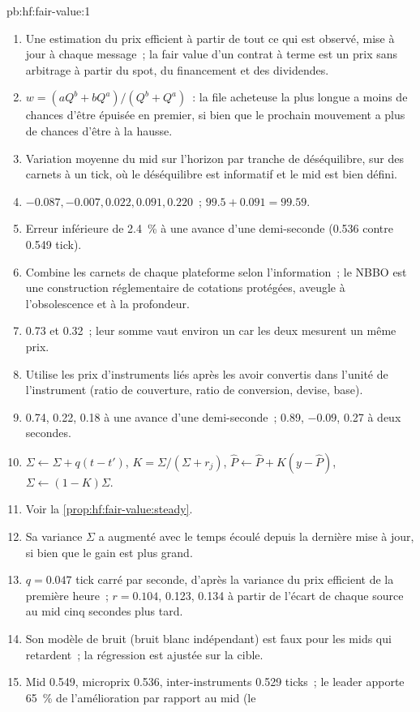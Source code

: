 \begin{solution}{pb:hf:fair-value:1}
\begin{enumerate}
\item Une estimation du prix efficient à partir de tout ce qui est observé, mise à jour à chaque message~; la fair value d'un contrat à terme est un prix sans arbitrage à partir
du spot, du financement et des dividendes.
\item $w=(aQ^b+bQ^a)/(Q^b+Q^a)$~: la file acheteuse la plus longue a moins de chances d'être épuisée en premier, si bien que le prochain mouvement a plus de chances d'être à la hausse.
\item Variation moyenne du mid sur l'horizon par tranche de déséquilibre, sur des carnets à un tick, où le déséquilibre est informatif et le mid est
bien défini.
\item $-0.087,-0.007,0.022,0.091,0.220$~; $99.5+0.091=99.59$.
\item Erreur inférieure de 2.4~\% à une avance d'une demi-seconde (0.536 contre 0.549 tick).
\item Combine les carnets de chaque plateforme selon l'information~; le NBBO est une construction réglementaire de cotations protégées, aveugle à l'obsolescence et à la profondeur.
\item 0.73 et 0.32~; leur somme vaut environ un car les deux mesurent un même prix.
\item Utilise les prix d'instruments liés après les avoir convertis dans l'unité de l'instrument (ratio de couverture, ratio de conversion, devise, base).
\item 0.74, 0.22, 0.18 à une avance d'une demi-seconde~; 0.89, $-0.09$, 0.27 à deux secondes.
\item $\Sigma\leftarrow\Sigma+q(t-t')$, $K=\Sigma/(\Sigma+r_j)$, $\hat P\leftarrow\hat P+K(y-\hat P)$, $\Sigma\leftarrow(1-K)\Sigma$.
\item Voir la \cref{prop:hf:fair-value:steady}.
\item Sa variance $\Sigma$ a augmenté avec le temps écoulé depuis la dernière mise à jour, si bien que le gain est plus grand.
\item $q=0.047$ tick carré par seconde, d'après la variance du prix efficient de la première heure~; $r=0.104$, 0.123, 0.134 à partir de l'écart de chaque source au mid cinq
secondes plus tard.
\item Son modèle de bruit (bruit blanc indépendant) est faux pour les mids qui retardent~; la régression est ajustée sur la cible.
\item Mid 0.549, microprix 0.536, inter-instruments 0.529 ticks~; le leader apporte 65~\% de l'amélioration par rapport au mid (le 

\end{enumerate}
\end{solution}

